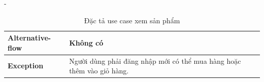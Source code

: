 \begin {list} {-}{}
\begin{itemize}
\begin{table}[H]
\begin{tabular}{|l|l|}
        \textbf{Alternative-flow} & Không có                                                                                                                                                                                                                                                                                                                                                                                                                                                                                                                                                                                                                                                                                                                                                                                                        \\ \hline
        \textbf{Exception}        & Người dùng phải đăng nhập mới có thể mua hàng hoặc thêm vào giỏ hàng.                                                                                                                                                                                                                                                                                                                                                                                                                                                                                                                                                                                                                                                                                                                                                                                                        \\ \hline
        \end{tabular}
        \begin{center}
        \end{center}
        \caption{Đặc tả use case xem sản phẩm}
        \label{table:product}
        \end{table}
        

\end{itemize}
\end{list}
